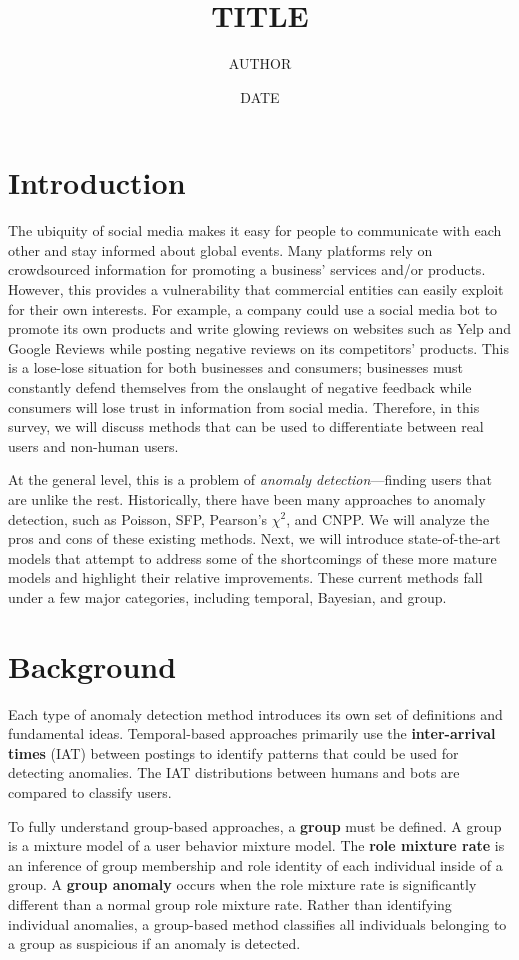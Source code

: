 \documentclass[11pt, oneside]{article}   	%
\title{TITLE}
\author{AUTHOR}
\date{DATE}							%
\begin{document}
\maketitle

\section*{Introduction}

\quad The ubiquity of social media makes it easy for people to communicate with each other and stay informed about global events.
Many platforms rely on crowdsourced information for promoting a business' services and/or products.
However, this provides a vulnerability that commercial entities can easily exploit for their own interests.
For example, a company could use a social media bot to promote its own products and write glowing reviews on websites such as Yelp and Google Reviews while posting negative reviews on its competitors' products.
This is a lose-lose situation for both businesses and consumers; businesses must constantly defend themselves from the onslaught of negative feedback while consumers will lose trust in information from social media.
Therefore, in this survey, we will discuss methods that can be used to differentiate between real users and non-human users.

\quad At the general level, this is a problem of \textit{anomaly detection}---finding users that are unlike the rest.
Historically, there have been many approaches to anomaly detection, such as Poisson, SFP, Pearson's $\chi^2$, and CNPP.
We will analyze the pros and cons of these existing methods.
Next, we will introduce state-of-the-art models that attempt to address some of the shortcomings of these more mature models and highlight their relative improvements. 
These current methods fall under a few major categories, including temporal, Bayesian, and group.

\section*{Background}

\quad Each type of anomaly detection method introduces its own set of definitions and fundamental ideas.
Temporal-based approaches primarily use the \textbf{inter-arrival times} (IAT) between postings to identify patterns that could be used for detecting anomalies.
The IAT distributions between humans and bots are compared to classify users.

\quad To fully understand group-based approaches, a \textbf{group} must be defined.
A group is a mixture model of a user behavior mixture model.
The \textbf{role mixture rate} is an inference of group membership and role identity of each individual inside of a group.
A \textbf{group anomaly} occurs when the role mixture rate is significantly different than a normal group role mixture rate.
Rather than identifying individual anomalies, a group-based method classifies all individuals belonging to a group as suspicious if an anomaly is detected.
\end{document}

